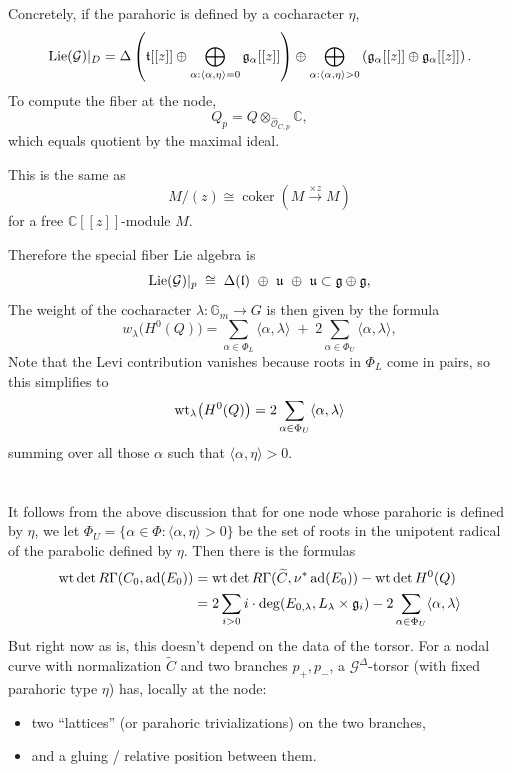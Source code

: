 \documentclass[12pt]{article}
\begin{document}
Concretely, if the parahoric is defined by a cocharacter $\eta$,
\[
\operatorname{Lie}(\mathcal{G})|_D
=
\Delta\left(
\mathfrak t[[z]]
\oplus
\bigoplus_{\alpha:\langle\alpha,\eta\rangle=0}
\mathfrak g_\alpha[[z]]
\right)
\oplus
\bigoplus_{\alpha:\langle\alpha,\eta\rangle>0}
\left(
\mathfrak g_\alpha[[z]]
\oplus
\mathfrak g_\alpha[[z]]
\right).
\]
To compute the fiber at the node,
\[
Q_p
=
Q \otimes_{\widehat{\mathcal{O}}_{C,p}} \mathbb{C},
\]
which equals quotient by the maximal ideal.

This is the same as
\[
M/(z)
\cong
\operatorname{coker}(M \xrightarrow{\times z} M)
\]
for a free $\mathbb{C}[[z]]$-module $M$.


Therefore the special fiber Lie algebra is
\[
\operatorname{Lie}(\mathcal G)|_{p}
\;\cong\;
\Delta(\mathfrak l)\ \oplus\ \mathfrak u\ \oplus\ \mathfrak u \subset \mathfrak{g}\oplus \mathfrak{g},
\]
The weight of the cocharacter $\lambda: \mathbb{G}_m \to G$ is then given by the formula \[
w_\lambda\bigl(H^0(Q)\bigr)
=
\sum_{\alpha\in\Phi_L}\langle \alpha,\lambda\rangle
\;+\;
2\sum_{\alpha\in\Phi_U}\langle \alpha,\lambda\rangle,
\] Note that the Levi contribution vanishes because roots in $\Phi_L$ come in pairs, so this simplifies to
\[
\operatorname{wt}_\lambda\bigl(H^0(Q)\bigr)
=
2\sum_{\alpha\in\Phi_U}\langle \alpha,\lambda\rangle
\] summing over all those $\alpha$ such that $\langle \alpha,\eta\rangle>0$.

\section{}
It follows from the above discussion that for one node whose parahoric is defined by $\eta$, we let $\Phi_U = \{\alpha\in\Phi:\langle\alpha,\eta\rangle>0\}$ be the set of roots in the unipotent radical of the parabolic defined by $\eta$. Then there is the formulas
\begin{align*}
    \operatorname{wt}\det R\Gamma(C_0,\operatorname{ad}(E_0)) &= \operatorname{wt}\det R\Gamma(\widetilde C,\nu^*\operatorname{ad}(E_0)) - \operatorname{wt}\det H^0(Q) \\
&= 2\sum_{i>0} i\cdot \deg(E_{0,\lambda},L_\lambda \times \mathfrak{g}_i) - 2\sum_{\alpha\in\Phi_U}\langle \alpha,\lambda\rangle
\end{align*}
But right now as is, this doesn't depend on the data of the torsor. For a nodal curve with normalization $\widetilde{C}$ and two branches $p_+, p_-$, a $\mathcal{G}^\Delta$-torsor (with fixed parahoric type $\eta$) has, locally at the node:
\begin{itemize}
    \item two ``lattices'' (or parahoric trivializations) on the two branches,
    \item and a gluing / relative position between them.
\end{itemize}
\end{document}
